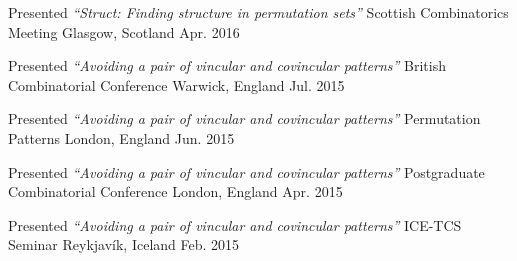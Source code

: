 \begin{cventries}
\cventrypresentation
  {Presented \textit{``Struct: Finding structure in permutation sets''}} %
  {Scottish Combinatorics Meeting} %
  {Glasgow, Scotland} %
  {Apr. 2016} %


\cventrypresentation
  {Presented \textit{``Avoiding a pair of vincular and covincular patterns''}} %
  {British Combinatorial Conference} %
  {Warwick, England} %
  {Jul. 2015} %


\cventrypresentation
  {Presented \textit{``Avoiding a pair of vincular and covincular patterns''}} %
  {Permutation Patterns} %
  {London, England} %
  {Jun. 2015} %


\cventrypresentation
  {Presented \textit{``Avoiding a pair of vincular and covincular patterns''}} %
  {Postgraduate Combinatorial Conference} %
  {London, England} %
  {Apr. 2015} %


\cventrypresentation
  {Presented \textit{``Avoiding a pair of vincular and covincular patterns''}} %
  {ICE-TCS Seminar} %
  {Reykjavík, Iceland} %
  {Feb. 2015} %



\end{cventries}
